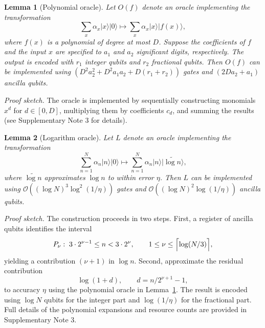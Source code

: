 \documentclass[aps,pra,twocolumn,superscriptaddress,preprintnumbers,amsmath,amssymb]{revtex4-2}
\newtheorem{Lemma}{Lemma}
\begin{document}
\begin{Lemma}[Polynomial oracle]\label{Le:poly}
Let $O(f)$ denote an oracle implementing the transformation 
\begin{equation}
    \sum_x\alpha_x|x\rangle|0\rangle\mapsto \sum_x\alpha_x|x\rangle|f(x)\rangle,
\end{equation}
where $f(x)$ is a polynomial of degree at most $D$. Suppose the coefficients of $f$ and the input $x$ are specified to $a_1$ and $a_2$ significant digits, respectively. The output is encoded with $r_1$ integer qubits and $r_2$ fractional qubits.
 Then  $O(f)$ can be implemented using $(D^{2}a_2^{2} + D^{2}a_1a_2 + D(r_1+r_2))$ gates and $(2Da_2+a_1)$ ancilla qubits.  
\end{Lemma}
\emph{Proof sketch.}  The oracle is implemented by sequentially constructing monomials $x^{d}$ for $d \in [0,D]$, multiplying them by coefficients $c_d$, and summing the results (see Supplementary Note 3 for details).

 \begin{Lemma}[Logarithm oracle]\label{le:log}
    Let $L$ denote an oracle implementing the transformation 
    \begin{equation}
        \sum_{n=1}^{N} \alpha_n|n\rangle|0\rangle \mapsto \sum_{n=1}^{N}\alpha_n|n\rangle|\widetilde{\log n}\rangle,
    \end{equation}
    where $\widetilde{\log n}$ approximates $\log n$ to within error $\eta$. Then $L$ can be implemented using 
       $\mathcal{O}((\log N)^3 \log^2(1/\eta))$
    gates and $\mathcal{O}((\log N)^2 \log(1/\eta))$ ancilla qubits. 
\end{Lemma}
\emph{Proof sketch.} The construction proceeds in two steps.
First, a register of ancilla qubits 
identifies the interval
\begin{equation}
    P_\nu:\; 3\cdot 2^{\nu-1} \leq n < 3\cdot 2^\nu,
    \qquad 1\leq \nu \leq \Bigl\lceil \log (N/3)\Bigr\rceil,
\end{equation}
yielding a contribution $(\nu+1)$ in $\log n$.
Second, approximate the residual contribution 
\begin{equation}
   \log(1+d), \qquad d = n/2^{\nu+1}-1,
\end{equation}
to accuracy $\eta$ using the polynomial oracle in Lemma~\ref{Le:poly}. 
The result is encoded using $\log N$ qubits for the integer part and $\log(1/\eta)$ for the fractional part. Full details of the polynomial expansions and resource counts are provided in  Supplementary Note 3.
\end{document}
